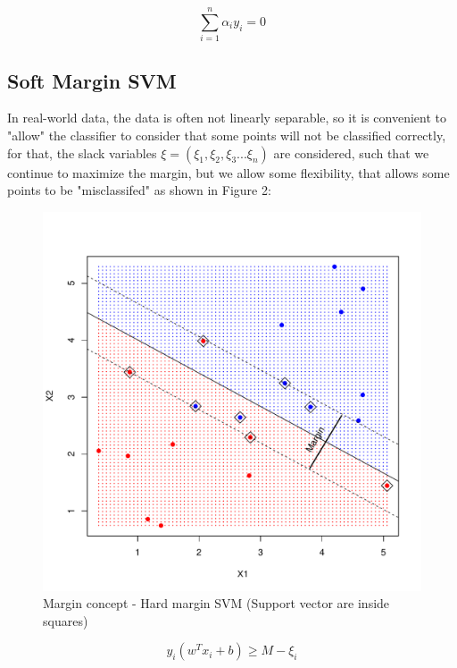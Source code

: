 \documentclass[11pt,twocolumn,letterpaper]{article}
\begin{document}
\begin{equation}
	\sum_{i=1}^{n} \alpha_i y_i = 0
\end{equation}

\subsection{Soft Margin SVM}

In real-world data, the data is often not linearly separable, so it is convenient to "allow" the classifier to consider that some points will not be classified correctly, for that, the slack variables $\xi = (\xi_1,\xi_2,\xi_3 ... \xi_n)$ are considered, such that we continue to maximize the margin, but we allow some flexibility, that allows some points to be "misclassifed" as shown in Figure 2:

\begin{figure}[h]
	\begin{center}
		\includegraphics[width=1.0\linewidth]{margin_sf.pdf}
	\end{center}
	\caption{Margin concept - Hard margin SVM (Support vector are inside squares)}
	\label{fig:margin_sf}
\end{figure}


\begin{equation}
	y_i(w^T x_i + b) \geq M - \xi_i 
\end{equation}
\end{document}

